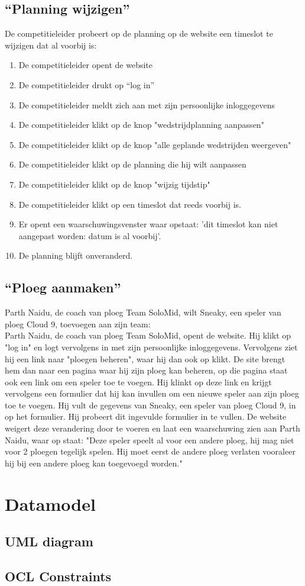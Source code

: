 \documentclass[12pt,a4paper]{article}
\begin{document}
			\subsection{``Planning wijzigen''}
			De competitieleider probeert op de planning op de website een timeslot te wijzigen dat al voorbij is:
			\begin{enumerate}
				\item De competitieleider opent de website
				\item De competitieleider drukt op “log in” 
				\item De competitieleider meldt zich aan met zijn persoonlijke inloggegevens
				\item De competitieleider klikt op de knop "wedstrijdplanning aanpassen" 
				\item De competitieleider klikt op de knop "alle geplande wedstrijden weergeven"
				\item De competitieleider klikt op de planning die hij wilt aanpassen
				\item De competitieleider klikt op de knop "wijzig tijdstip"
				\item De competitieleider klikt op een timeslot dat reeds voorbij is.
				\item Er opent een waarschuwingsvenster waar opstaat: 'dit timeslot kan niet aangepast worden: datum is al voorbij'.
				\item De planning blijft onveranderd.
			\end{enumerate}
			\subsection{``Ploeg aanmaken''}
			Parth Naidu, de coach van ploeg Team SoloMid, wilt Sneaky, een speler van ploeg Cloud 9, toevoegen aan zijn team:
			\\
			Parth Naidu, de coach van ploeg Team SoloMid, opent de website. Hij klikt op "log in" en logt vervolgens in met zijn persoonlijke inloggegevens. Vervolgens ziet hij een link naar "ploegen beheren", waar hij dan ook op klikt. De site brengt hem dan naar een pagina waar hij zijn ploeg kan beheren, op die pagina staat ook een link om een speler toe te voegen. Hij klinkt op deze link en krijgt vervolgens een formulier dat hij kan invullen om een nieuwe speler aan zijn ploeg toe te voegen. Hij vult de gegevens van Sneaky, een speler van ploeg Cloud 9, in op het formulier. Hij probeert dit ingevulde formulier in te vullen. De website weigert deze verandering door te voeren en laat een waarschuwing zien aan Parth Naidu, waar op staat: "Deze speler speelt al voor een andere ploeg, hij mag niet voor 2 ploegen tegelijk spelen. Hij moet eerst de andere ploeg verlaten vooraleer hij bij een andere ploeg kan toegevoegd worden."
			
			\section{Datamodel}
			\subsection{UML diagram}
			\subsection{OCL Constraints}
\end{document}
